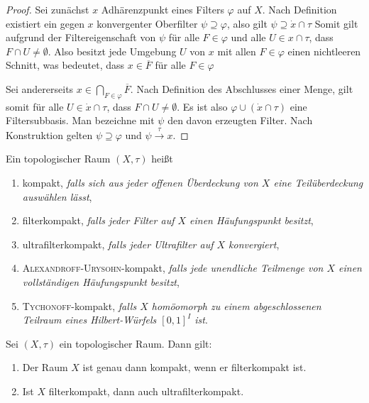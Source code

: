 \begin{proof}
  Sei zunächst $x$ Adhärenzpunkt eines Filters $\varphi$ auf $X$.
  Nach Definition existiert ein gegen $x$ konvergenter Oberfilter $\psi \supseteq \varphi$, also gilt $\psi \supseteq \dot x \cap \tau$
  Somit gilt aufgrund der Filtereigenschaft von $\psi$ für alle $F \in \varphi$ und alle $U \in x \cap \tau$, dass  $F \cap U \neq \emptyset$.
  Also besitzt jede Umgebung $U$ von $x$ mit allen $F \in \varphi$ einen nichtleeren Schnitt, was bedeutet, dass $x \in \overline F$ für alle $F  \in \varphi$

  Sei andererseits $x \in \bigcap_{F \in \varphi} \overline F$.
  Nach Definition des Abschlusses einer Menge, gilt somit für alle $U \in \dot x \cap \tau$, dass $F \cap U \neq \emptyset$.
  Es ist also $\varphi \cup (\dot x \cap \tau)$ eine Filtersubbasis.
  Man bezeichne mit $\psi$ den davon erzeugten Filter.
  Nach Konstruktion gelten $\psi \supseteq \varphi$ und $\psi \overset{\tau}{\to} x$.

\end{proof}

\begin{defn}
  Ein topologischer Raum $(X,\tau)$ heißt
  \begin{enumerate}[(1)]
    \item kompakt, \textit{falls sich aus jeder offenen Überdeckung von $X$ eine Teilüberdeckung auswählen lässt},
    \item filterkompakt, \textit{falls jeder Filter auf $X$ einen Häufungspunkt besitzt},
    \item ultrafilterkompakt, \textit{falls jeder Ultrafilter auf $X$ konvergiert},
    \item \textsc{Alexandroff}-\textsc{Urysohn}-kompakt, \textit{falls jede unendliche Teilmenge von $X$ einen vollständigen Häufungspunkt besitzt},
    \item \textsc{Tychonoff}-kompakt, \textit{falls $X$ homöomorph zu einem abgeschlossenen Teilraum eines Hilbert-Würfels $[0,1]^I$ ist}.
  \end{enumerate}
\end{defn}


\begin{thm}
\label{thm:compactness}
  Sei $(X,\tau)$ ein topologischer Raum. Dann gilt:
  \begin{enumerate}[(1)]
    \item Der Raum $X$ ist genau dann kompakt, wenn er filterkompakt ist. 
    \item Ist $X$ filterkompakt, dann auch ultrafilterkompakt.
  \end{enumerate}
\end{thm}

